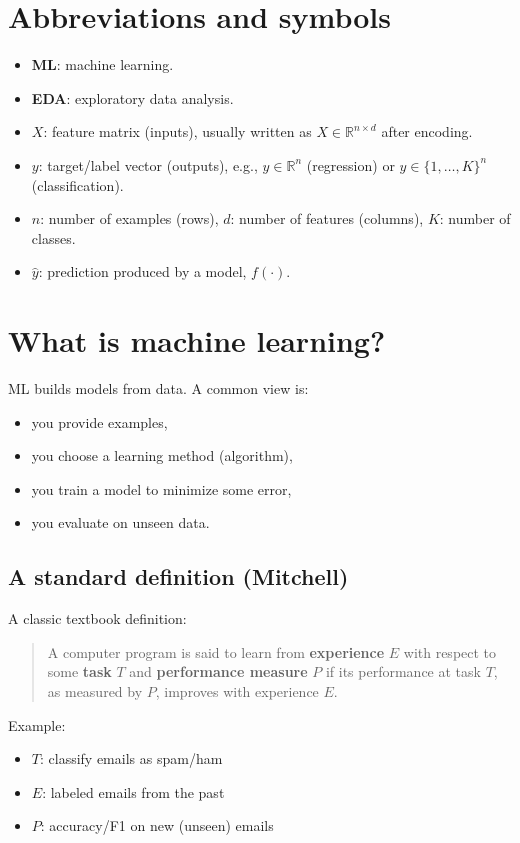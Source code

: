 \documentclass[11pt]{article}
\begin{document}
\section{Abbreviations and symbols}
\begin{itemize}[leftmargin=*]
  \item \textbf{ML}: machine learning.
  \item \textbf{EDA}: exploratory data analysis.
  \item $X$: feature matrix (inputs), usually written as $X \in \mathbb{R}^{n \times d}$ after encoding.
  \item $y$: target/label vector (outputs), e.g., $y \in \mathbb{R}^n$ (regression) or $y \in \{1,\dots,K\}^n$ (classification).
  \item $n$: number of examples (rows), $d$: number of features (columns), $K$: number of classes.
  \item $\hat{y}$: prediction produced by a model, $f(\cdot)$.
\end{itemize}

\section{What is machine learning?}
ML builds models from data. A common view is:
\begin{itemize}[leftmargin=*]
  \item you provide examples,
  \item you choose a learning method (algorithm),
  \item you train a model to minimize some error,
  \item you evaluate on unseen data.
\end{itemize}

\subsection{A standard definition (Mitchell)}
A classic textbook definition:
\begin{quote}
  A computer program is said to learn from \textbf{experience} $E$ with respect to some \textbf{task} $T$ and \textbf{performance measure} $P$ if its performance at task $T$, as measured by $P$, improves with experience $E$.
\end{quote}

Example:
\begin{itemize}[leftmargin=*]
  \item $T$: classify emails as spam/ham
  \item $E$: labeled emails from the past
  \item $P$: accuracy/F1 on new (unseen) emails
\end{itemize}
\end{document}
